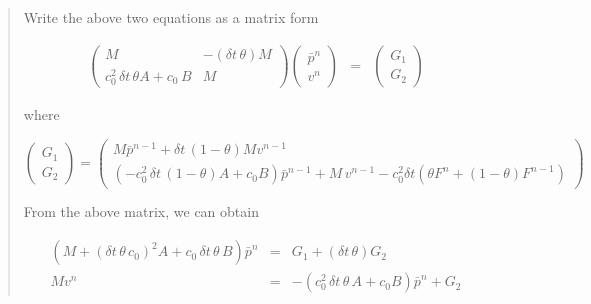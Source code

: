 \documentclass[english]{article}
\begin{document}
\begin{quote}
Write the above two equations as a matrix form

\begin{eqnarray*}
\left(\begin{array}{cc}
M & -(\delta t\,\theta)M\\
c_{0}^{2}\,\delta t\,\theta A+c_{0}\, B & M\end{array}\right)\left(\begin{array}{c}
\bar{p}^{n}\\
v^{n}\end{array}\right) & = & \left(\begin{array}{c}
G_{1}\\
G_{2}\end{array}\right)\end{eqnarray*}


where 

\begin{center}$\left(\begin{array}{c}
G_{1}\\
G_{2}\end{array}\right)=\left(\begin{array}{c}
M\bar{p}^{n-1}+\delta t\,(1-\theta)Mv^{n-1}\\
(-c_{0}^{2}\,\delta t\,(1-\theta)A+c_{0}B)\bar{p}^{n-1}+M\, v^{n-1}-c_{0}^{2}\delta t(\theta F^{n}+(1-\theta)F^{n-1})\end{array}\right)$\end{center}

From the above matrix, we can obtain

\begin{eqnarray*}
(M+(\delta t\,\theta\, c_{0})^{2}A+c_{0}\,\delta t\,\theta\, B)\bar{p}^{n} & = & G_{1}+(\delta t\,\theta)G_{2}\\
Mv^{n} & = & -(c_{0}^{2}\,\delta t\,\theta\, A+c_{0}B)\bar{p}^{n}+G_{2}\end{eqnarray*}

\end{quote}
\end{document}
